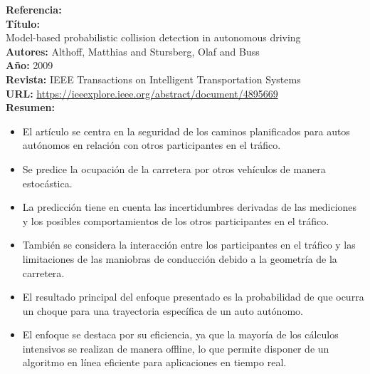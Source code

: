 \documentclass[10pt,letterpaper,final]{article}
\begin{document}
\begin{longtable}
        \clearpage
        \hline
        \noindent \textbf{Referencia:}~\cite{althoff2009model}                                         \\
        \textbf{Título:}                                                                               \\
        Model-based probabilistic collision detection in autonomous driving                            \\
        \textbf{Autores:}
        Althoff, Matthias and Stursberg, Olaf and Buss                                                 \\
        \textbf{Año:}
        2009                                                                                           \\
        \textbf{Revista:}
        IEEE Transactions on Intelligent Transportation Systems                                        \\
        \textbf{URL:}
        \url{https://ieeexplore.ieee.org/abstract/document/4895669}                                    \\
        \textbf{Resumen:}                                                                              \\
        \begin{itemize}
            \item El artículo se centra en la seguridad de los caminos planificados para autos autónomos en relación con otros participantes en el tráfico.
            \item Se predice la ocupación de la carretera por otros vehículos de manera estocástica.
            \item La predicción tiene en cuenta las incertidumbres derivadas de las mediciones y los posibles comportamientos
            de los otros participantes en el tráfico.
            \item También se considera la interacción entre los participantes en el tráfico y las limitaciones de las maniobras
            de conducción debido a la geometría de la carretera.
            \item El resultado principal del enfoque presentado es la probabilidad de que ocurra un choque para una trayectoria específica de un auto autónomo.
            \item El enfoque se destaca por su eficiencia, ya que la mayoría de los cálculos intensivos se realizan de manera
            offline, lo que permite disponer de un algoritmo en línea eficiente para aplicaciones en tiempo real.

\end{itemize}
\end{longtable}
\end{document}

